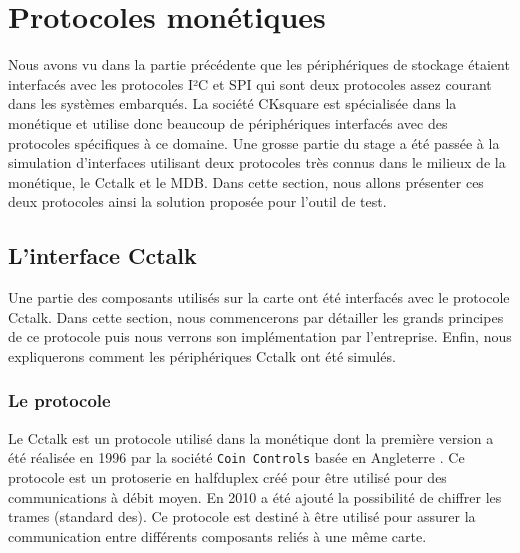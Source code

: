 \documentclass[a4paper]{article}
\begin{document}
\section{Protocoles monétiques}%

Nous avons vu dans la partie précédente que les périphériques de stockage
étaient interfacés avec les protocoles I²C et SPI qui sont deux protocoles assez
courant dans les systèmes embarqués. La société CKsquare est spécialisée dans la
monétique et utilise donc beaucoup de périphériques interfacés avec des
protocoles spécifiques à ce domaine. Une grosse partie du stage a été passée à
la simulation d'interfaces utilisant deux protocoles très connus dans le milieux
de la monétique, le Cctalk et le MDB. Dans cette section, nous allons présenter
ces deux protocoles ainsi la solution proposée pour l'outil de test.

\subsection{L'interface Cctalk}%
\label{interfacecctalk}

Une partie des composants utilisés sur la carte ont été interfacés avec le
protocole Cctalk. Dans cette section, nous commencerons par détailler les grands
principes de ce protocole puis nous verrons son implémentation par l'entreprise.
Enfin, nous expliquerons comment les périphériques Cctalk ont été simulés.

\subsubsection{Le protocole}

Le Cctalk est un protocole utilisé dans la monétique dont la première version a
été réalisée en 1996 par la société \verb|Coin Controls| basée en Angleterre
\cite{cctalkpt1}. Ce protocole est un \gls{protoserie} en \gls{halfduplex} créé
pour être utilisé pour des communications à débit moyen. En 2010 a été ajouté la
possibilité de chiffrer les trames (standard \gls{des}). Ce protocole est
destiné à être utilisé pour assurer la communication entre différents composants
reliés à une même carte.
\end{document}
